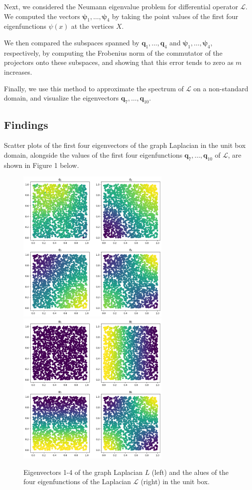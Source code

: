 \documentclass[12pt,a4paper]{article}
\theoremstyle{definition}
\theoremstyle{remark}
\begin{document}
Next, we considered the Neumann eigenvalue problem for differential operator $\mathcal{L}$. We computed the vectors $\boldsymbol{\psi}_1, \dots, \boldsymbol{\psi}_4$ by taking the point values of the first four eigenfunctions $\psi(x)$ at the vertices $X$.

We then compared the subspaces spanned by ${\mathbf{q}_1, \dots, \mathbf{q}_4}$ and ${\boldsymbol{\psi}_1, \dots, \boldsymbol{\psi}_4}$, respectively, by computing the Frobenius norm of the commutator of the projectors onto these subspaces, and showing that this error tends to zero as $m$ increases. 

Finally, we use this method to approximate the spectrum of $\mathcal L$ on a non-standard domain, and visualize the eigenvectors $\mathbf{q}_7, \dots, \mathbf{q}_{10}$.

\subsection{Findings}

Scatter plots of the first four eigenvectors of the graph Laplacian in the unit box domain, alongside the values of the first four eigenfunctions $\mathbf{q}_7, \dots, \mathbf{q}_{10}$ of $\mathcal L$, are shown in Figure 1 below.

\begin{figure}[h]
    \centering
    \includegraphics[width=7.5cm]{fig1.png}
    \includegraphics*[width=7.5cm]{fig2.png}
    \caption{Eigenvectors 1-4 of the graph Laplacian $L$ (left) and the alues of the four eigenfunctions of the Laplacian $\mathcal L$ (right) in the unit box.}
\end{figure}
\end{document}
